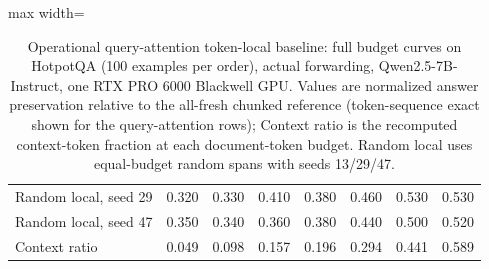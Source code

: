 \begin{table}[t]
\begin{adjustbox}{max width=\textwidth}
\begin{tabular}{lrrrrrrr}
Random local, seed 29 & 0.320 & 0.330 & 0.410 & 0.380 & 0.460 & 0.530 & 0.530 \\
Random local, seed 47 & 0.350 & 0.340 & 0.360 & 0.380 & 0.440 & 0.500 & 0.520 \\
Context ratio & 0.049 & 0.098 & 0.157 & 0.196 & 0.294 & 0.441 & 0.589 \\
\bottomrule
\end{tabular}
\end{adjustbox}
\caption{Operational query-attention token-local baseline: full budget curves on HotpotQA (100 examples per order), actual forwarding, Qwen2.5-7B-Instruct, one RTX PRO 6000 Blackwell GPU. Values are normalized answer preservation relative to the all-fresh chunked reference (token-sequence exact shown for the query-attention rows); Context ratio is the recomputed context-token fraction at each document-token budget. Random local uses equal-budget random spans with seeds 13/29/47.}
\label{tab:app-local-full}
\end{table}

